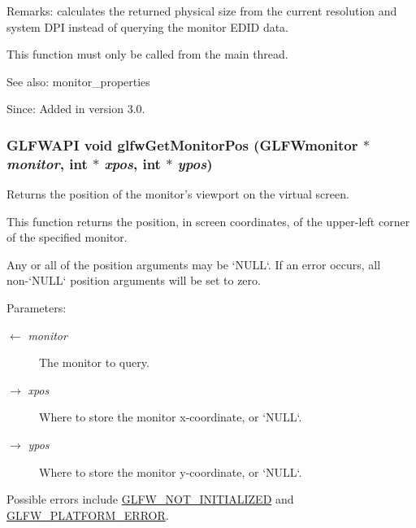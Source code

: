\begin{Desc}
\item[Remarks:]calculates the returned physical size from the current resolution and system DPI instead of querying the monitor EDID data.\end{Desc}
This function must only be called from the main thread.

\begin{Desc}
\item[See also:]monitor\_\-properties\end{Desc}
\begin{Desc}
\item[Since:]Added in version 3.0. \end{Desc}
\hypertarget{group__monitor_g45b5481a614ad7beb2aade9746d07563}{
\subsubsection[glfwGetMonitorPos]{\setlength{\rightskip}{0pt plus 5cm}GLFWAPI void glfwGetMonitorPos ({\bf GLFWmonitor} $\ast$ {\em monitor}, \/  int $\ast$ {\em xpos}, \/  int $\ast$ {\em ypos})}}
\label{group__monitor_g45b5481a614ad7beb2aade9746d07563}


Returns the position of the monitor's viewport on the virtual screen. 

This function returns the position, in screen coordinates, of the upper-left corner of the specified monitor.

Any or all of the position arguments may be `NULL`. If an error occurs, all non-`NULL` position arguments will be set to zero.

\begin{Desc}
\item[Parameters:]
\begin{description}
\item[\mbox{$\leftarrow$} {\em monitor}]The monitor to query. \item[\mbox{$\rightarrow$} {\em xpos}]Where to store the monitor x-coordinate, or `NULL`. \item[\mbox{$\rightarrow$} {\em ypos}]Where to store the monitor y-coordinate, or `NULL`.\end{description}
\end{Desc}
Possible errors include \hyperlink{group__errors_g2374ee02c177f12e1fa76ff3ed15e14a}{GLFW\_\-NOT\_\-INITIALIZED} and \hyperlink{group__errors_gd44162d78100ea5e87cdd38426b8c7a1}{GLFW\_\-PLATFORM\_\-ERROR}.

